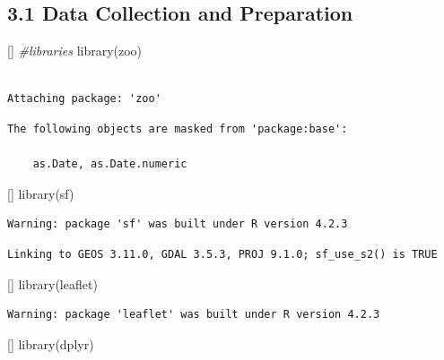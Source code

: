 \documentclass[12pt,letterpaper]{article}
\newenvironment{Shaded}{\begin{snugshade}}{\end{snugshade}}
\newenvironment{Highlighting}{}{}
\newcommand{\CommentTok}[1]{\textcolor[rgb]{0.56,0.35,0.01}{\textit{#1}}}
\newcommand{\FunctionTok}[1]{\textcolor[rgb]{0.00,0.00,0.00}{#1}}
\newcommand{\NormalTok}[1]{#1}
\begin{document}
\subsection{3.1 Data Collection and
Preparation}\label{data-collection-and-preparation}

\begin{Shaded}
\begin{Highlighting}[]
\CommentTok{\#libraries}
\FunctionTok{library}\NormalTok{(zoo)}
\end{Highlighting}
\end{Shaded}

\begin{verbatim}

Attaching package: 'zoo'
\end{verbatim}

\begin{verbatim}
The following objects are masked from 'package:base':

    as.Date, as.Date.numeric
\end{verbatim}

\begin{Shaded}
\begin{Highlighting}[]
\FunctionTok{library}\NormalTok{(sf)}
\end{Highlighting}
\end{Shaded}

\begin{verbatim}
Warning: package 'sf' was built under R version 4.2.3
\end{verbatim}

\begin{verbatim}
Linking to GEOS 3.11.0, GDAL 3.5.3, PROJ 9.1.0; sf_use_s2() is TRUE
\end{verbatim}

\begin{Shaded}
\begin{Highlighting}[]
\FunctionTok{library}\NormalTok{(leaflet)}
\end{Highlighting}
\end{Shaded}

\begin{verbatim}
Warning: package 'leaflet' was built under R version 4.2.3
\end{verbatim}

\begin{Shaded}
\begin{Highlighting}[]
\FunctionTok{library}\NormalTok{(dplyr)}
\end{Highlighting}
\end{Shaded}
\end{document}
